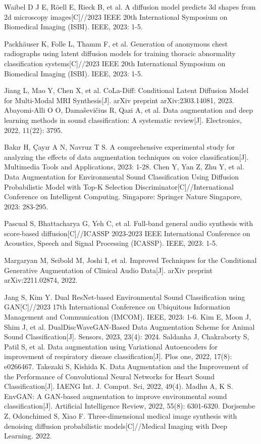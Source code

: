 \documentclass[preprint,12pt,authoryear]{elsarticle}
\begin{document}
\begin{thebibliography}{00}
 Waibel D J E, Röell E, Rieck B, et al. A diffusion model predicts 3d shapes from 2d microscopy images[C]//2023 IEEE 20th International Symposium on Biomedical Imaging (ISBI). IEEE, 2023: 1-5.

 Packhäuser K, Folle L, Thamm F, et al. Generation of anonymous chest radiographs using latent diffusion models for training thoracic abnormality classification systems[C]//2023 IEEE 20th International Symposium on Biomedical Imaging (ISBI). IEEE, 2023: 1-5.

 Jiang L, Mao Y, Chen X, et al. CoLa-Diff: Conditional Latent Diffusion Model for Multi-Modal MRI Synthesis[J]. arXiv preprint arXiv:2303.14081, 2023.
 Abayomi-Alli O O, Damaševičius R, Qazi A, et al. Data augmentation and deep learning methods in sound classification: A systematic review[J]. Electronics, 2022, 11(22): 3795.

 Bakır H, Çayır A N, Navruz T S. A comprehensive experimental study for analyzing the effects of data augmentation techniques on voice classification[J]. Multimedia Tools and Applications, 2023: 1-28.
 Chen Y, Yan Z, Zhu Y, et al. Data Augmentation for Environmental Sound Classification Using Diffusion Probabilistic Model with Top-K Selection Discriminator[C]//International Conference on Intelligent Computing. Singapore: Springer Nature Singapore, 2023: 283-295.

 Pascual S, Bhattacharya G, Yeh C, et al. Full-band general audio synthesis with score-based diffusion[C]//ICASSP 2023-2023 IEEE International Conference on Acoustics, Speech and Signal Processing (ICASSP). IEEE, 2023: 1-5.


 Margaryan M, Seibold M, Joshi I, et al. Improved Techniques for the Conditional Generative Augmentation of Clinical Audio Data[J]. arXiv preprint arXiv:2211.02874, 2022.

 Jang S, Kim Y. Dual ResNet-based Environmental Sound Classification using GAN[C]//2023 17th International Conference on Ubiquitous Information Management and Communication (IMCOM). IEEE, 2023: 1-6.
 Kim E, Moon J, Shim J, et al. DualDiscWaveGAN-Based Data Augmentation Scheme for Animal Sound Classification[J]. Sensors, 2023, 23(4): 2024.
 Saldanha J, Chakraborty S, Patil S, et al. Data augmentation using Variational Autoencoders for improvement of respiratory disease classification[J]. Plos one, 2022, 17(8): e0266467.
 Takezaki S, Kishida K. Data Augmentation and the Improvement of the Performance of Convolutional Neural Networks for Heart Sound Classification[J]. IAENG Int. J. Comput. Sci, 2022, 49(4).
 Madhu A, K S. EnvGAN: A GAN-based augmentation to improve environmental sound classification[J]. Artificial Intelligence Review, 2022, 55(8): 6301-6320.
 Dorjsembe Z, Odonchimed S, Xiao F. Three-dimensional medical image synthesis with denoising diffusion probabilistic models[C]//Medical Imaging with Deep Learning. 2022.

\end{thebibliography}
\end{document}
